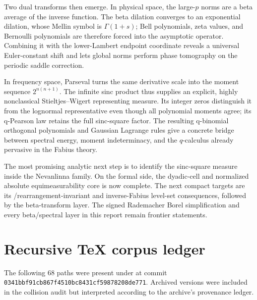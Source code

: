 \documentclass[11pt,oneside]{article}
\numberwithin{equation}{section}
\theoremstyle{plain}
\theoremstyle{definition}
\theoremstyle{remark}
\newcommand{\RepoCommit}{\nolinkurl{0341bbf91cb867f4510bc8431cf59878208de771}}
\begin{document}
Two dual transforms then emerge.  In physical space, the large-$p$ norms are a beta average
of the inverse function.  The beta dilation converges to an exponential dilation, whose
Mellin symbol is $\Gamma(1+s)$; Bell polynomials, zeta values, and Bernoulli polynomials are
therefore forced into the asymptotic operator.  Combining it with the lower-Lambert endpoint
coordinate reveals a universal Euler-constant shift and lets global norms perform phase
tomography on the periodic saddle correction.

In frequency space, Parseval turns the same derivative scale into the moment sequence
$2^{n(n+1)}$.  The infinite sinc product thus supplies an explicit, highly nonclassical
Stieltjes--Wigert representing measure.  Its integer zeros distinguish it from the lognormal
representative even though all polynomial moments agree; its q-Pearson law retains the full
sinc-square factor.  The resulting q-binomial orthogonal polynomials and Gaussian Lagrange
rules give a concrete bridge between spectral energy, moment indeterminacy, and the
$q$-calculus already pervasive in the Fabius theory.

The most promising analytic next step is to identify the sinc-square measure inside the
Nevanlinna family.  On the formal side, the dyadic-cell and normalized absolute
equimeasurability core is now complete.  The next compact targets are its
/rearrangement-invariant and inverse-Fabius level-set consequences, followed
by the beta-transform layer.  The signed Rademacher Borel simplification and every
beta/spectral layer in this report remain frontier statements.

\appendix

\section{Recursive TeX corpus ledger}
\label{app:corpus-ledger}

The following $68$ paths were present under
 at commit \RepoCommit.  Archived versions were included
in the collision audit but interpreted according to the archive's provenance ledger.
\end{document}
